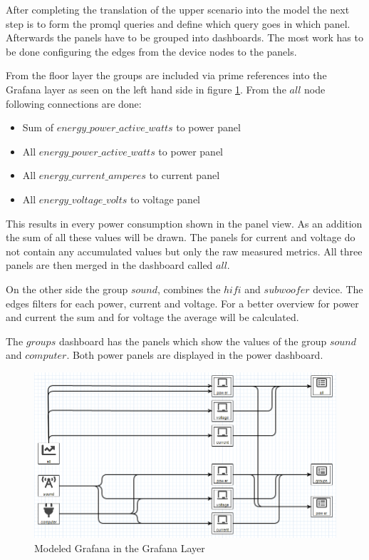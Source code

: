 After completing the translation of the upper scenario into the model the next step is to form the \gls{promql} queries and define which query goes in which panel. Afterwards the panels have to be grouped into dashboards. The most work has to be done configuring the edges from the device nodes to the panels.

From the floor layer the groups are included via prime references into the Grafana layer as seen on the left hand side in figure \ref{fig:modelGrafanaLayer}. From the $all$ node following connections are done:

\begin{itemize}
	\item Sum of $energy\_power\_active\_watts$ to power panel
	\item All $energy\_power\_active\_watts$ to power panel
	\item All $energy\_current\_amperes$ to current panel
 	\item All $energy\_voltage\_volts$ to voltage panel
\end{itemize}

This results in every power consumption shown in the panel view. As an addition the sum of all these values will be drawn. The panels for current and voltage do not contain any accumulated values but only the raw measured metrics. All three panels are then merged in the dashboard called $all$.

On the other side the group $sound$, combines the $hifi$ and $subwoofer$ device. The edges filters for each power, current and voltage. For a better overview for power and current the sum and for voltage the average will be calculated. 

The $groups$ dashboard has the panels which show the values of the group $sound$ and $computer$. Both power panels are displayed in the power dashboard.

\begin{figure}[!ht]
	\centering 
	\includegraphics[width=\linewidth]{assets/images/grafanaLayer}
	\caption{Modeled Grafana in the Grafana Layer}
	\label{fig:modelGrafanaLayer}
\end{figure}

